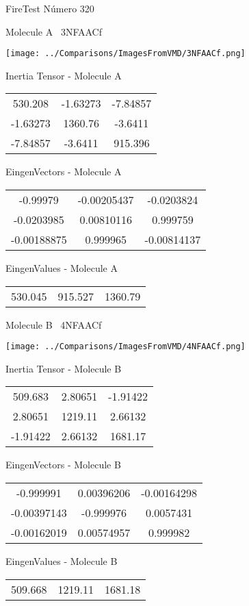 \vtab[-3cm]
\begin{center}
{\large FireTest \tab Número 320}
\end{center}
\begin{multicols}{2}
\begin{center}

Molecule A \
3NFAACf

\texttt{[image: ../Comparisons/ImagesFromVMD/3NFAACf.png]}

Inertia Tensor - Molecule A \\
\begin{tabular}{|c c c|}
530.208	 & 	-1.63273	 & 	-7.84857	 \\
-1.63273	 & 	1360.76	 & 	-3.6411	 \\
-7.84857	 & 	-3.6411	 & 	915.396
\end{tabular}

\vtab
 EingenVectors - Molecule A     \\
\begin{tabular}{|c c c|}
-0.99979	 & 	-0.00205437	 & 	-0.0203824	 \\
-0.0203985	 & 	0.00810116	 & 	0.999759	 \\
-0.00188875	 & 	0.999965	 & 	-0.00814137
\end{tabular}

\vtab
 EingenValues - Molecule A     \\
\begin{tabular}{|c c c|}
530.045	 & 	915.527	 & 	1360.79	 \\
\end{tabular}
\columnbreak

Molecule B \
4NFAACf

\texttt{[image: ../Comparisons/ImagesFromVMD/4NFAACf.png]}

Inertia Tensor - Molecule B \\
\begin{tabular}{|c c c|}
509.683	 & 	2.80651	 & 	-1.91422	 \\
2.80651	 & 	1219.11	 & 	2.66132	 \\
-1.91422	 & 	2.66132	 & 	1681.17
\end{tabular}

\vtab
 EingenVectors - Molecule B     \\
\begin{tabular}{|c c c|}
-0.999991	 & 	0.00396206	 & 	-0.00164298	 \\
-0.00397143	 & 	-0.999976	 & 	0.0057431	 \\
-0.00162019	 & 	0.00574957	 & 	0.999982
\end{tabular}

\vtab
 EingenValues - Molecule B     \\
\begin{tabular}{|c c c|}
509.668	 & 	1219.11	 & 	1681.18	 \\
\end{tabular}

\end{center}
\end{multicols}

